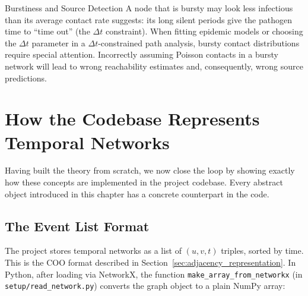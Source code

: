 \begin{keyinsight}{Burstiness and Source Detection}
A node that is bursty may look less infectious than its average contact rate suggests: its
long silent periods give the pathogen time to ``time out'' (the $\Delta t$ constraint). When
fitting epidemic models or choosing the $\Delta t$ parameter in a $\Delta t$-constrained path
analysis, bursty contact distributions require special attention. Incorrectly assuming Poisson
contacts in a bursty network will lead to wrong reachability estimates and, consequently, wrong
source predictions.
\end{keyinsight}

\section{How the Codebase Represents Temporal Networks}
\label{sec:codebase_representation}

Having built the theory from scratch, we now close the loop by showing exactly how these
concepts are implemented in the project codebase. Every abstract object introduced in this
chapter has a concrete counterpart in the code.

\subsection{The Event List Format}

The project stores temporal networks as a list of $(u, v, t)$ triples, sorted by time. This is
the COO format described in Section~\ref{sec:adjacency_representation}. In Python, after
loading via NetworkX, the function \texttt{make\_array\_from\_networkx} (in
\texttt{setup/read\_network.py}) converts the graph object to a plain NumPy array:

